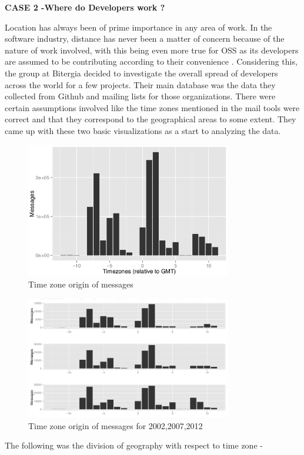 \documentclass[seploa]{beavtex}
\begin{document}
 \textbf{CASE 2 -Where do Developers work ?}

Location has always been of prime importance in any area of work. In the software industry, distance has never been a matter of concern because of the nature of work involved, with this being even more true for OSS as its developers are assumed to be contributing according to their convenience \cite{yuri2010}. Considering this, the group at Bitergia decided to investigate the overall spread of developers across the world for a few projects. Their main database was the data they collected from Github and mailing lists for those organizations. There were certain assumptions involved like the time zones mentioned in the mail tools were correct and that they correspond to the geographical areas to some extent. They came up with these two basic visualizations as a start to analyzing the data.

\begin{figure}[!ht]
\centering
\includegraphics[width=90mm]{work1.png}
\caption{Time zone origin of messages}
\end{figure}

\begin{figure}[!ht]
\centering
\includegraphics[width=90mm]{work2.png}
\caption{Time zone origin of messages for 2002,2007,2012}
\end{figure}

The following was the division of geography with respect to time zone -
\end{document}
